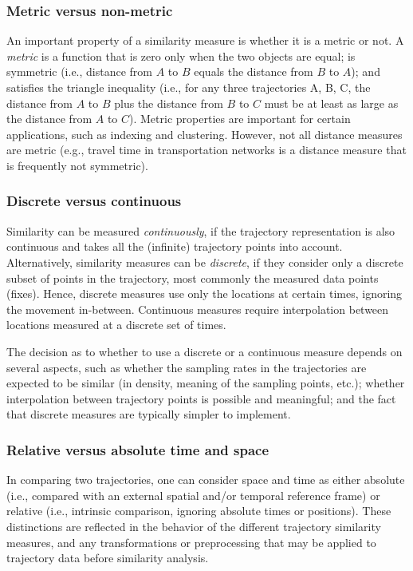 \documentclass[10pt,letterpaper]{article}
\begin{document}
\subsubsection{Metric versus non-metric}
An important property of a similarity measure is whether it is a metric or not. 
A \emph{metric} is a function that is zero only when the two objects are equal; is symmetric (i.e., distance from $A$ to $B$ equals the distance from $B$ to $A$); and satisfies the triangle inequality (i.e., for any three trajectories A, B, C, the distance from $A$ to $B$ plus the distance from $B$ to $C$ must be at least as large as the distance from $A$ to $C$). Metric properties are important for certain applications, such as indexing and clustering. However, not all distance measures are metric (e.g., travel time in transportation networks is a distance measure that is frequently not symmetric). 


\subsubsection{Discrete versus continuous}
Similarity can be measured \emph{continuously}, if the trajectory representation  is also continuous and takes all the (infinite) trajectory points into account. Alternatively,  similarity measures can be \emph{discrete}, if they consider only a discrete subset of points in the trajectory, most commonly the measured data points (fixes). Hence, discrete measures use only the locations at certain times, ignoring the movement in-between. Continuous measures require interpolation between locations measured at a discrete set of times.  

The decision as to whether to use a discrete or a continuous measure depends on several aspects, such as whether the sampling rates in the trajectories are expected to be similar (in density, meaning of the sampling points, etc.); whether interpolation between trajectory points is possible and meaningful; and the fact that discrete measures are typically simpler to implement.


\subsubsection{Relative versus absolute time and space}
In comparing two trajectories, one can consider space and time as either absolute (i.e., compared with an external spatial and/or temporal reference frame) or relative (i.e., intrinsic comparison, ignoring absolute times or positions). These distinctions are reflected in the behavior of the different trajectory similarity measures, and any transformations or preprocessing that may be applied to trajectory data before similarity analysis.
\end{document}
